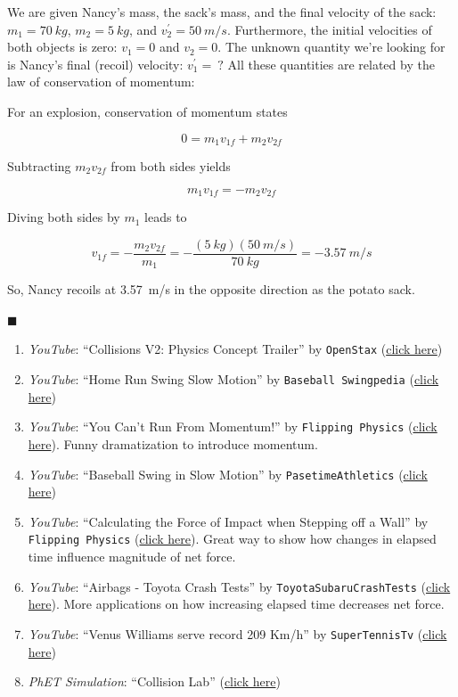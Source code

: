 \documentclass[dvipsnames]{article}
\begin{document}
We are given Nancy's mass, the sack's mass, and the final velocity of the sack: $m_1 = \SI{70}{kg}$, $m_2 = \SI{5}{kg}$, and $v_2^{\prime} = \SI{50}{m/s}$. Furthermore, the initial velocities of both objects is zero: $v_1 = 0$ and $v_2 = 0$. The unknown quantity we're looking for is Nancy's final (recoil) velocity: $v_1^{\prime} =\ ?$ All these quantities are related by the law of conservation of momentum:

For an explosion, conservation of momentum states

\begin{equation*}
    0 = m_1 v_{1f} + m_2 v_{2f}
\end{equation*}

Subtracting $m_2 v_{2f}$ from both sides yields

\begin{equation*}
    m_1 v_{1f} = -m_2 v_{2f}
\end{equation*}

Diving both sides by $m_1$ leads to

\begin{equation*}
    v_{1f} = -\frac{m_2 v_{2f}}{m_1} = -\frac{(\SI{5}{kg})(\SI{50}{m/s})}{\SI{70}{kg}} 
    = \boxed{-\SI{3.57}{m/s}}
\end{equation*}

So, Nancy recoils at \SI{3.57}{m/s} in the opposite direction as the potato sack.

\hfill $\blacksquare$


\begin{enumerate}
\setlength\itemsep{0.1ex}
    \item \textit{YouTube}: ``Collisions V2: Physics Concept Trailer'' by \texttt{OpenStax} (\href{https://youtu.be/hxMaoFcYSrw}{click here})
    \item \textit{YouTube}: ``Home Run Swing Slow Motion'' by \texttt{Baseball Swingpedia} (\href{https://youtu.be/4cdbV6m_49U}{click here})
    \item \textit{YouTube}: ``You Can't Run From Momentum!'' by \texttt{Flipping Physics} (\href{https://youtu.be/K-lH-DoD6Tk}{click here}). Funny dramatization to introduce momentum. 
    \item \textit{YouTube}: ``Baseball Swing in Slow Motion'' by \texttt{PasetimeAthletics} (\href{https://youtu.be/jvY06zoY0M4}{click here})
    \item \textit{YouTube}: ``Calculating the Force of Impact when Stepping off a Wall'' by \texttt{Flipping Physics} (\href{https://youtu.be/ILIFo2X7EUY}{click here}). Great way to show how changes in elapsed time influence magnitude of net force.
    \item \textit{YouTube}: ``Airbags - Toyota Crash Tests'' by \texttt{ToyotaSubaruCrashTests} (\href{https://youtu.be/Bw0Ps8-KDlQ}{click here}). More applications on how increasing elapsed time decreases net force.
    \item \textit{YouTube}: ``Venus Williams serve record 209 Km/h'' by \texttt{SuperTennisTv} (\href{https://youtu.be/6b1NSgQZvdo}{click here})
    \item \textit{PhET Simulation}: ``Collision Lab'' (\href{https://phet.colorado.edu/en/simulations/collision-lab}{click here})
\end{enumerate}
\end{document}
